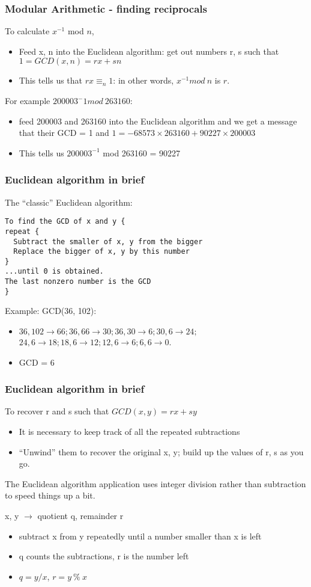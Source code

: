 \documentclass[10pt, hyperref={pdfpagelabels=false}]{beamer}
\begin{document}
\begin{frame}
\frametitle{Modular Arithmetic - finding reciprocals}
To calculate $x^{-1}$ mod $n$,
\begin{itemize}
\item Feed x, n into the Euclidean algorithm: get out numbers r, s such that
$1 = GCD (x, n) = r x + s n$
\item This tells us that $r x \equiv_n 1$: in other words, $x^{-1} mod~n$ is $r$.
\end{itemize}

For example $200003^-1 mod~263160$:
\begin{itemize}
\item feed 200003 and 263160 into the Euclidean algorithm and we get
a message that their GCD = 1 and $1 = -68573\times263160 + 90227\times200003$
\item This tells us $200003^{-1}$ mod 263160 = 90227
\end{itemize}
\end{frame}

\begin{frame} [fragile]
\frametitle{Euclidean algorithm in brief}
The ``classic'' Euclidean algorithm:
{\color{blue}
\begin{verbatim}
To find the GCD of x and y {
repeat {
  Subtract the smaller of x, y from the bigger
  Replace the bigger of x, y by this number
}
...until 0 is obtained.
The last nonzero number is the GCD
}
\end{verbatim}
}

Example: GCD(36, 102):
\begin{itemize}
\item $36,102 \rightarrow 66; 36,66 \rightarrow 30; 36,30 \rightarrow 6; 30,6 \rightarrow 24;$ $24,6 \rightarrow 18; 18,6 \rightarrow 12; 12,6 \rightarrow 6; 6,6 \rightarrow 0$.
\item GCD = 6
\end{itemize}
\end{frame}

\begin{frame}
\frametitle{Euclidean algorithm in brief}
To recover r and s such that $GCD(x, y) = r x + s  y$
\begin{itemize}
\item It is necessary to keep track of all the repeated subtractions
\item ``Unwind'' them to recover the original x, y; build up the values of
r, s as you go.
\end{itemize}

The Euclidean algorithm application uses integer division rather than subtraction to speed things up a bit.

x, y $\rightarrow$ quotient q, remainder r
\begin{itemize}
\item subtract x from y repeatedly until a number smaller than x is left
\item q counts the subtractions, r is the number left
\item $q = y / x$, $r = y~\%~x$
\end{itemize}
\end{frame}
\end{document}
